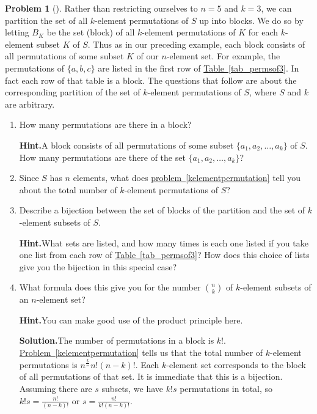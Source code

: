 \documentclass[10pt,]{book}
\theoremstyle{plain}
\theoremstyle{definition}
\newtheorem{activity}[project]{Problem}
\theoremstyle{definition}
\numberwithin{equation}{chapter}
\begin{document}
\begin{activity}[]\label{formulanchoosek}
Rather than restricting ourselves to \(n=5\) and \(k=3\), we can partition the set of all \(k\)-element permutations of \(S\) up into blocks. We do so by letting \(B_K\) be the set (block) of all \(k\)-element permutations of \(K\) for each \(k\)-element subset \(K\) of \(S\). Thus as in our preceding example, each block consists of all permutations of some subset \(K\) of our \(n\)-element set. For example, the permutations of \(\{a,b,c\}\) are listed in the first row of \hyperref[tab_permsof3]{Table~\ref{tab_permsof3}}. In fact each row of that table is a block. The questions that follow are about the corresponding partition of the set of \(k\)-element permutations of \(S\), where \(S\) and \(k\) are arbitrary.%
\begin{enumerate}[font=\bfseries,label=(\alph*),ref=\alph*]
\item\label{task-34} How many permutations are there in a block?%
\par\medskip\noindent%
\textbf{Hint.}\quad A block consists of all permutations of some subset \(\{a_1 , a_2, \ldots, a_k \}\) of \(S\). How many permutations are there of the set \(\{a_1 , a_2, \ldots, a_k \}\)?%
\item\label{task-35} Since \(S\) has \(n\) elements, what does \hyperref[kelementpermutation]{problem~\ref{kelementpermutation}} tell you about the total number of \(k\)-element permutations of \(S\)?%
\item\label{task-36} Describe a bijection between the set of blocks of the partition and the set of \(k\)-element subsets of \(S\).%
\par\medskip\noindent%
\textbf{Hint.}\quad What sets are listed, and how many times is each one listed if you take one list from each row of \hyperref[tab_permsof3]{Table~\ref{tab_permsof3}}? How does this choice of lists give you the bijection in this special case?%
\item\label{formulanchoosekfinal} What formula does this give you for the number \(\binom{n}{k}\) of \(k\)-element subsets of an \(n\)-element set?%
\par\medskip\noindent%
\textbf{Hint.}\quad You can make good use of the product principle here.%
\par\medskip\noindent%
\textbf{Solution.}\quad The number of permutations in a block is \(k!\). \hyperref[kelementpermutation]{Problem~\ref{kelementpermutation}} tells us that the total number of \(k\)-element permutations is \(n^\frac{\underline{k}}={n!}{ (n-k)!}\). Each \(k\)-element set corresponds to the block of all permutations of that set. It is immediate that this is a bijection. Assuming there are \(s\) subsets, we have \(k!s\) permutations in total, so \(k!s=\frac{n!}{(n-k)!}\) or \(s= \frac{n!}{k!(n-k)!}\).%
\end{enumerate}
\end{activity}
\end{document}
